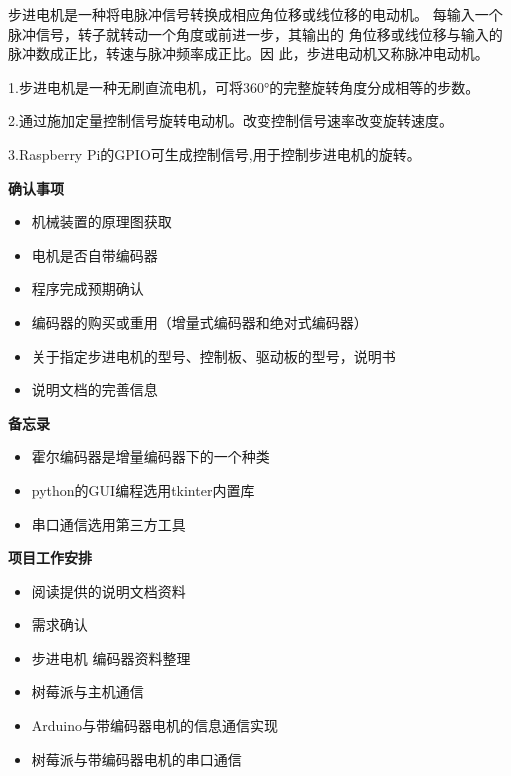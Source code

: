\documentclass[UTF8,14pt]{article}
\newcommand\sectionone[1]{\centerline{\Large{\bfseries{#1}}}}
\begin{document}
步进电机是一种将电脉冲信号转换成相应角位移或线位移的电动机。
每输入一个脉冲信号，转子就转动一个角度或前进一步，其输出的
角位移或线位移与输入的脉冲数成正比，转速与脉冲频率成正比。因
此，步进电动机又称脉冲电动机。

1.步进电机是一种无刷直流电机，可将360°的完整旋转角度分成相等的步数。

2.通过施加定量控制信号旋转电动机。改变控制信号速率改变旋转速度。

3.Raspberry Pi的GPIO可生成控制信号,用于控制步进电机的旋转。


\clearpage
\sectionone{确认事项}
\begin{itemize}
	\item 机械装置的原理图获取
	\item 电机是否自带编码器
	\item 程序完成预期确认
	\item 编码器的购买或重用（增量式编码器和绝对式编码器）
	\item 关于指定步进电机的型号、控制板、驱动板的型号，说明书
	\item 说明文档的完善信息
\end{itemize}

\vspace{0.5cm}
\sectionone{备忘录}
\begin{itemize}
	\item 霍尔编码器是增量编码器下的一个种类
	\item python的GUI编程选用tkinter内置库
	\item 串口通信选用第三方工具
\end{itemize}

\vspace{0.5cm}
\sectionone{项目工作安排}
\begin{itemize}
	\item 阅读提供的说明文档资料
	\item 需求确认
	\item 步进电机 编码器资料整理
	\item 树莓派与主机通信
	\item Arduino与带编码器电机的信息通信实现
	\item 树莓派与带编码器电机的串口通信
\end{itemize}
\end{document}
